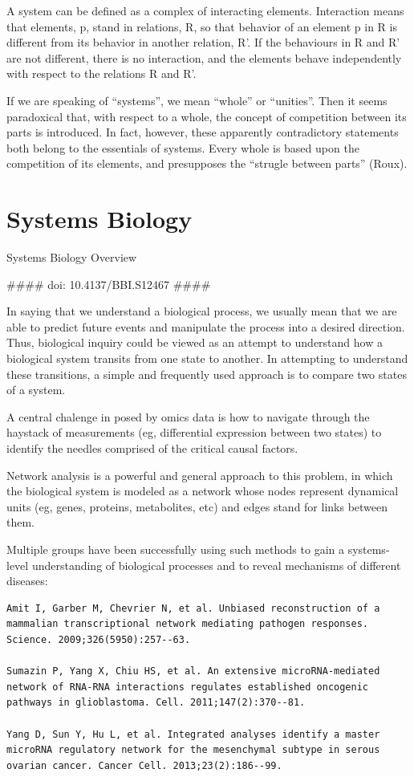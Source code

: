 \documentclass[
]{book}
\begin{document}
A system can be defined as a complex of interacting elements. Interaction means that elements, p, stand in relations, R, so that behavior of an element p in R is different from its behavior in another relation, R'. If the behaviours in R and R' are not different, there is no interaction, and the elements behave independently with respect to the relations R and R'.

If we are speaking of ``systems'', we mean ``whole'' or ``unities''. Then it seems paradoxical that, with respect to a whole, the concept of competition between its parts is introduced. In fact, however, these apparently contradictory statements both belong to the essentials of systems. Every whole is based upon the competition of its elements, and presupposes the ``strugle between parts'' (Roux).

\hypertarget{systems-biology-2}{%
\section{Systems Biology}\label{systems-biology-2}}

Systems Biology Overview

\#\#\#\# doi: 10.4137/BBI.S12467 \#\#\#\#

In saying that we understand a biological process, we usually mean that we are able to predict future events and manipulate the process into a desired direction. Thus, biological inquiry could be viewed as an attempt to understand how a biological system transits from one state to another. In attempting to understand these transitions, a simple and frequently used approach is to compare two states of a system.

A central chalenge in posed by omics data is how to navigate through the haystack of measurements (eg, differential expression between two states) to identify the needles comprised of the critical causal factors.

Network analysis is a powerful and general approach to this problem, in which the biological system is modeled as a network whose nodes represent dynamical units (eg, genes, proteins, metabolites, etc) and edges stand for links between them.

Multiple groups have been successfully using such methods to gain a systems-level understanding of biological processes and to reveal mechanisms of different diseases:

\begin{verbatim}
Amit I, Garber M, Chevrier N, et al. Unbiased reconstruction of a mammalian transcriptional network mediating pathogen responses. Science. 2009;326(5950):257--63.

Sumazin P, Yang X, Chiu HS, et al. An extensive microRNA-mediated network of RNA-RNA interactions regulates established oncogenic pathways in glioblastoma. Cell. 2011;147(2):370--81.

Yang D, Sun Y, Hu L, et al. Integrated analyses identify a master microRNA regulatory network for the mesenchymal subtype in serous ovarian cancer. Cancer Cell. 2013;23(2):186--99.
\end{verbatim}
\end{document}
